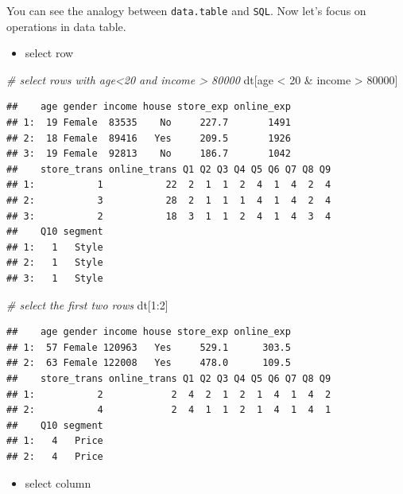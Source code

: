 \documentclass[12pt,]{krantz}
\newenvironment{Shaded}{\begin{snugshade}}{\end{snugshade}}
\newcommand{\DecValTok}[1]{\textcolor[rgb]{0.00,0.00,0.81}{{#1}}}
\newcommand{\StringTok}[1]{\textcolor[rgb]{0.31,0.60,0.02}{{#1}}}
\newcommand{\CommentTok}[1]{\textcolor[rgb]{0.56,0.35,0.01}{\textit{{#1}}}}
\newcommand{\NormalTok}[1]{{#1}}
\providecommand{\tightlist}{%
  \setlength{\itemsep}{0pt}\setlength{\parskip}{0pt}}
\theoremstyle{definition}
\theoremstyle{definition}
\theoremstyle{remark}
\begin{document}
You can see the analogy between \texttt{data.table} and \texttt{SQL}.
Now let's focus on operations in data table.

\begin{itemize}
\tightlist
\item
  select row
\end{itemize}

\begin{Shaded}
\begin{Highlighting}[]
\CommentTok{# select rows with age<20 and income > 80000}
\NormalTok{dt[age <}\StringTok{ }\DecValTok{20} \NormalTok{&}\StringTok{ }\NormalTok{income >}\StringTok{ }\DecValTok{80000}\NormalTok{]}
\end{Highlighting}
\end{Shaded}

\begin{verbatim}
##    age gender income house store_exp online_exp
## 1:  19 Female  83535    No     227.7       1491
## 2:  18 Female  89416   Yes     209.5       1926
## 3:  19 Female  92813    No     186.7       1042
##    store_trans online_trans Q1 Q2 Q3 Q4 Q5 Q6 Q7 Q8 Q9
## 1:           1           22  2  1  1  2  4  1  4  2  4
## 2:           3           28  2  1  1  1  4  1  4  2  4
## 3:           2           18  3  1  1  2  4  1  4  3  4
##    Q10 segment
## 1:   1   Style
## 2:   1   Style
## 3:   1   Style
\end{verbatim}

\begin{Shaded}
\begin{Highlighting}[]
\CommentTok{# select the first two rows}
\NormalTok{dt[}\DecValTok{1}\NormalTok{:}\DecValTok{2}\NormalTok{]}
\end{Highlighting}
\end{Shaded}

\begin{verbatim}
##    age gender income house store_exp online_exp
## 1:  57 Female 120963   Yes     529.1      303.5
## 2:  63 Female 122008   Yes     478.0      109.5
##    store_trans online_trans Q1 Q2 Q3 Q4 Q5 Q6 Q7 Q8 Q9
## 1:           2            2  4  2  1  2  1  4  1  4  2
## 2:           4            2  4  1  1  2  1  4  1  4  1
##    Q10 segment
## 1:   4   Price
## 2:   4   Price
\end{verbatim}

\begin{itemize}
\tightlist
\item
  select column
\end{itemize}
\end{document}
